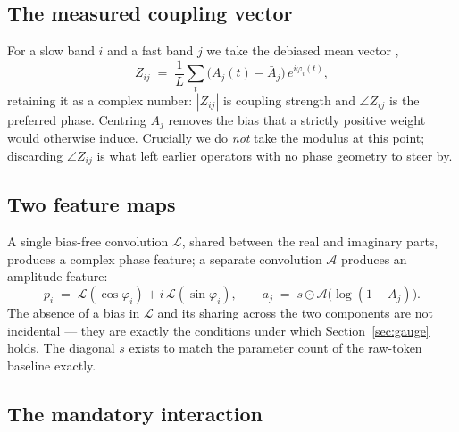 \documentclass{article}
\begin{document}
\subsection{The measured coupling vector}

For a slow band $i$ and a fast band $j$ we take the debiased mean vector
\citep{canolty2006high},
\begin{equation}
Z_{ij} \;=\; \frac{1}{L}\sum_{t} \bigl(A_j(t) - \bar{A}_j\bigr)\, e^{i\varphi_i(t)} ,
\label{eq:Z}
\end{equation}
retaining it as a complex number: $|Z_{ij}|$ is coupling strength and
$\angle Z_{ij}$ is the preferred phase. Centring $A_j$ removes the bias that a
strictly positive weight would otherwise induce. Crucially we do \emph{not} take
the modulus at this point; discarding $\angle Z_{ij}$ is what left earlier
operators with no phase geometry to steer by.

\subsection{Two feature maps}

A single bias-free convolution $\mathcal{L}$, shared between the real and
imaginary parts, produces a complex phase feature; a separate convolution
$\mathcal{A}$ produces an amplitude feature:
\begin{equation}
p_i \;=\; \mathcal{L}(\cos\varphi_i) + i\,\mathcal{L}(\sin\varphi_i),
\qquad
a_j \;=\; s \odot \mathcal{A}\bigl(\log(1+A_j)\bigr).
\label{eq:feats}
\end{equation}
The absence of a bias in $\mathcal{L}$ and its sharing across the two components
are not incidental --- they are exactly the conditions under which
Section~\ref{sec:gauge} holds. The diagonal $s$ exists to match the parameter
count of the raw-token baseline exactly.

\subsection{The mandatory interaction}
\end{document}
